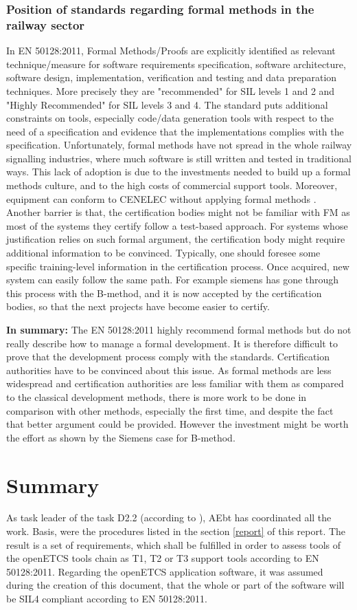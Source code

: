 \documentclass{template/openetcs_report}
\begin{document}
\subsection{Position of standards regarding formal methods in the railway sector}
In EN 50128:2011, Formal Methods/Proofs are explicitly identified as relevant technique/measure for software requirements specification, software architecture, software design, implementation, verification and testing and data preparation techniques. More precisely they are "recommended" for SIL levels 1 and 2 and "Highly Recommended" for SIL levels 3 and 4. The standard puts additional constraints on tools, especially code/data generation tools with respect to the need of a specification and evidence that the implementations complies with the specification. 
Unfortunately, formal methods have not spread in the whole railway signalling industries, where much software is still written and tested in traditional ways. This lack of adoption is due to the investments needed to build up a formal methods culture, and to the high costs of commercial support tools. Moreover, equipment can conform to CENELEC without applying formal methods \cite{Proc-doc}. 
Another barrier is that, the certification bodies might not be familiar with FM as most of the systems they certify follow a test-based approach. For systems whose justification relies on such formal argument, the certification body might require additional information to be convinced. Typically, one should foresee some specific training-level information in the certification process. Once acquired, new system can easily follow the same path. For example siemens has gone through this process with the B-method, and it is now accepted by the certification bodies, so that the next projects have become easier to certify. 

\textbf{In summary:} The EN 50128:2011 highly recommend formal methods but do not really describe how to manage a formal development. It is therefore difficult to prove that the development process comply with the standards. Certification authorities have to be convinced about this issue. 
As formal methods are less widespread and certification authorities are less familiar with them as compared to the classical development methods, there is more work to be done in comparison with other methods, especially the first time, and despite the fact that better argument could be provided. However the investment might be worth the effort as shown by the Siemens case for B-method. 


\chapter{Summary}
As task leader of the task D2.2 (according to \cite{FPP13}), AEbt has coordinated all the work. Basis, were the procedures listed in the section \ref{report} of this report. The result is a set of requirements, which shall be fulfilled in order to assess tools of the openETCS tools chain as T1, T2 or T3 support tools according to EN 50128:2011. 
Regarding the openETCS application software, it was assumed during the creation of this document, that the whole or part of the software will be SIL4 compliant according to EN 50128:2011.
\end{document}
